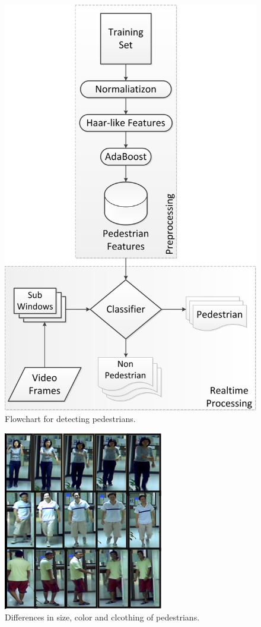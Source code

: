 \documentclass{article}
\begin{document}
\begin{figure}[h!]
	\centering
	\includegraphics[scale=0.5]{HaarTrainingFlowChart.png}
	\caption{Flowchart for detecting pedestrians.}
	\label{fig:flowchart}
\end{figure}
\begin{figure}
	\centering
	\includegraphics[scale=0.5]{People.png}
	\caption{Differences in size, color and clcothing of pedestrians.}
	\label{fig:people}
\end{figure}
\end{document}
